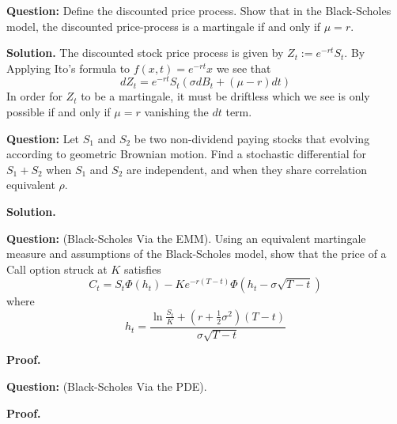 \documentclass{article}
\begin{document}
\begin{tcolorbox}[colframe=black,colback=gray!5,boxrule=0.5pt]
\textbf{Question:} Define the discounted price process. Show that in the Black-Scholes model, the discounted price-process is a martingale if and only if $\mu = r$.
\end{tcolorbox}
\textbf{Solution.} The discounted stock price process is given by $Z_t := e^{-rt}S_t$. By Applying Ito's formula to $f(x,t) = e^{-rt}x$ we see that 
$$dZ_t = e^{-rt}S_t(\sigma dB_t + (\mu-r)dt)$$
In order for $Z_t$ to be a martingale, it must be driftless which we see is only possible if and only if $\mu = r$ vanishing the $dt$ term.


\begin{tcolorbox}[colframe=black,colback=gray!5,boxrule=0.5pt]
\textbf{Question:} Let $S_1$ and $S_2$ be two non-dividend paying stocks that evolving according to geometric Brownian motion. Find a stochastic differential for $S_1 + S_2$ when $S_1$ and $S_2$ are independent, and when they share correlation equivalent $\rho$.  \cite{Hull}
\end{tcolorbox}
\textbf{Solution.}

\begin{tcolorbox}[colframe=black,colback=gray!5,boxrule=0.5pt]
\textbf{Question:} (Black-Scholes Via the EMM). Using an equivalent martingale measure and assumptions of the Black-Scholes model, show that the price of a Call option struck at $K$ satisfies
$$C_t = S_t\Phi(h_t) - Ke^{-r(T-t)}\Phi(h_t-\sigma\sqrt{T-t})$$
where 
$$h_t = \frac{\ln\frac{S_t}{K} + (r+\frac{1}{2}\sigma^2)(T-t)}{\sigma\sqrt{T-t}}$$
\end{tcolorbox}
\textbf{Proof.}

\begin{tcolorbox}[colframe=black,colback=gray!5,boxrule=0.5pt]
\textbf{Question:} (Black-Scholes Via the PDE). 
\end{tcolorbox}
\textbf{Proof.}
\end{document}
